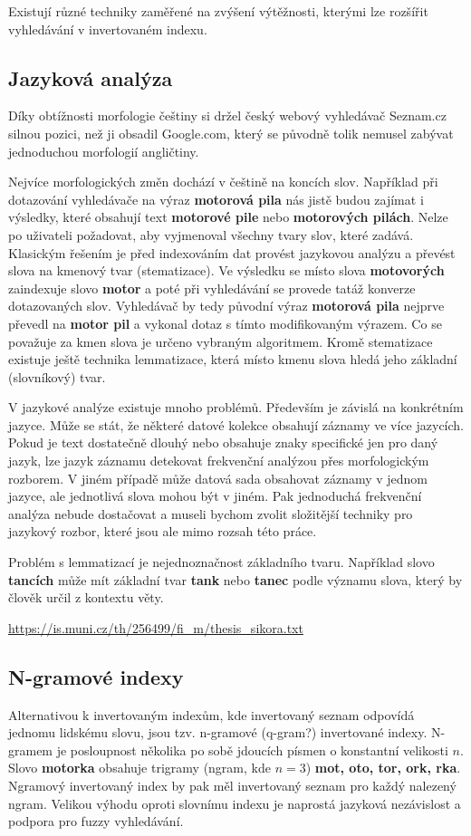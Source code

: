 \documentclass[11pt]{article}
\begin{document}
Existují různé techniky zaměřené na zvýšení výtěžnosti, kterými lze rozšířit
vyhledávání v invertovaném indexu.

\subsection{Jazyková analýza}
Díky obtížnosti morfologie češtiny si držel český webový vyhledávač Seznam.cz
silnou pozici, než ji obsadil Google.com, který se původně tolik nemusel
zabývat jednoduchou morfologií angličtiny.

Nejvíce morfologických změn dochází v češtině na koncích slov. Například při
dotazování vyhledávače na výraz \textbf{motorová pila} nás jistě budou zajímat
i výsledky, které obsahují text \textbf{motorové pile} nebo \textbf{motorových
pilách}. Nelze po uživateli požadovat, aby vyjmenoval všechny tvary slov, které
zadává. Klasickým řešením je před indexováním dat provést jazykovou analýzu a
převést slova na kmenový tvar (stematizace). Ve výsledku se místo slova
\textbf{motovorých} zaindexuje slovo \textbf{motor} a poté při vyhledávání se
provede tatáž konverze dotazovaných slov. Vyhledávač by tedy původní výraz
\textbf{motorová pila} nejprve převedl na \textbf{motor pil} a vykonal dotaz s
tímto modifikovaným výrazem. Co se považuje za kmen slova je určeno vybraným
algoritmem. Kromě stematizace existuje ještě technika lemmatizace, která místo
kmenu slova hledá jeho základní (slovníkový) tvar. 

V jazykové analýze existuje mnoho problémů. Především je závislá na konkrétním
jazyce. Může se stát, že některé datové kolekce obsahují záznamy ve více
jazycích. Pokud je text dostatečně dlouhý nebo obsahuje znaky specifické jen
pro daný jazyk, lze jazyk záznamu detekovat frekvenční analýzou přes
morfologickým rozborem. V jiném případě může datová sada obsahovat záznamy v
jednom jazyce, ale jednotlivá slova mohou být v jiném. Pak jednoduchá
frekvenční analýza nebude dostačovat a museli bychom zvolit složitější techniky
pro jazykový rozbor, které jsou ale mimo rozsah této práce.

Problém s lemmatizací je nejednoznačnost základního tvaru. Například slovo
\textbf{tancích} může mít základní tvar \textbf{tank} nebo \textbf{tanec} podle
významu slova, který by člověk určil z kontextu věty. 

\url{https://is.muni.cz/th/256499/fi_m/thesis_sikora.txt}

\subsection{N-gramové indexy}
Alternativou k invertovaným indexům, kde invertovaný seznam odpovídá jednomu
lidskému slovu, jsou tzv. n-gramové (q-gram?) invertované indexy. N-gramem je
posloupnost několika po sobě jdoucích písmen o konstantní velikosti $n$.  Slovo
\textbf{motorka} obsahuje trigramy (ngram, kde $n = 3$) \textbf{mot, oto, tor,
ork, rka}.  Ngramový invertovaný index by pak měl invertovaný seznam pro každý
nalezený ngram.  Velikou výhodu oproti slovnímu indexu je naprostá jazyková
nezávislost a podpora pro fuzzy vyhledávání.
\end{document}
